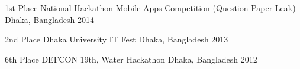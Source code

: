 



\begin{cvhonors}

  \cvhonor
    {1st Place} %
    {National Hackathon Mobile Apps Competition (Question Paper Leak)} %
    {Dhaka, Bangladesh} %
    {2014} %

  \cvhonor
    {2nd Place} %
    {Dhaka University IT Fest} %
    {Dhaka, Bangladesh} %
    {2013} %

  \cvhonor
    {6th Place} %
    {DEFCON 19th, Water Hackathon} %
    {Dhaka, Bangladesh} %
    {2012} %

\end{cvhonors}







